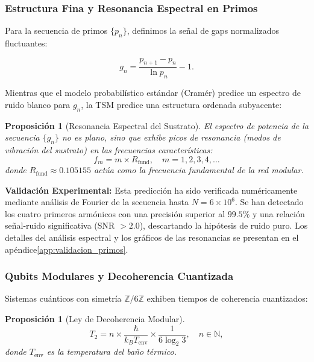 \documentclass[11pt, a4paper]{article}
\theoremstyle{plain}
\newtheorem{proposicion}[teorema]{Proposición}
\theoremstyle{definition}
\newcommand{\Zmod}{\mathbb{Z}/6\mathbb{Z}}
\newcommand{\Rfactor}{R_{\text{fund}}}
\begin{document}
\subsubsection{Estructura Fina y Resonancia Espectral en Primos}

Para la secuencia de primos $\{p_n\}$, definimos la señal de gaps normalizados fluctuantes:

\begin{equation}
g_n = \frac{p_{n+1} - p_n}{\ln p_n} - 1.
\end{equation}

Mientras que el modelo probabilístico estándar (Cramér) predice un espectro de ruido blanco para $g_n$, la TSM predice una estructura ordenada subyacente:

\begin{proposicion}[Resonancia Espectral del Sustrato]
El espectro de potencia de la secuencia $\{g_n\}$ no es plano, sino que exhibe picos de resonancia (modos de vibración del sustrato) en las frecuencias características:
\begin{equation}
f_m = m \times \Rfactor, \quad m = 1, 2, 3, 4, \dots
\end{equation}
donde $\Rfactor \approx 0.105155$ actúa como la frecuencia fundamental de la red modular.
\end{proposicion}

\textbf{Validación Experimental:} 
Esta predicción ha sido verificada numéricamente mediante análisis de Fourier de la secuencia hasta $N=6 \times 10^6$. Se han detectado los cuatro primeros armónicos con una precisión superior al $99.5\%$ y una relación señal-ruido significativa (SNR $> 2.0$), descartando la hipótesis de ruido puro. Los detalles del análisis espectral y los gráficos de las resonancias se presentan en el apéndice\ref{app:validacion_primos}.

\subsubsection{Qubits Modulares y Decoherencia Cuantizada}

Sistemas cuánticos con simetría $\Zmod$ exhiben tiempos de coherencia cuantizados:

\begin{proposicion}[Ley de Decoherencia Modular]
\begin{equation}
T_2 = n \times \frac{\hbar}{k_B T_{\text{env}}} \times \frac{1}{6\log_2 3}, \quad n \in \mathbb{N},
\end{equation}
donde $T_{\text{env}}$ es la temperatura del baño térmico.
\end{proposicion}
\end{document}
